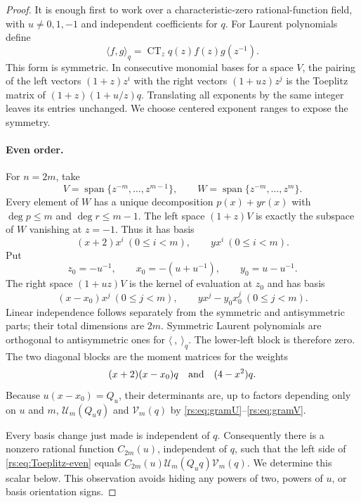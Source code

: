 \documentclass[11pt]{article}
\theoremstyle{definition}
\theoremstyle{remark}
\newcommand{\CT}{\operatorname{CT}}
\newcommand{\UU}{\mathcal U}
\newcommand{\VV}{\mathcal V}
\theoremstyle{definition}
\theoremstyle{plain}
\numberwithin{equation}{section}
\begin{document}
\begin{proof}
It is enough first to work over a characteristic-zero rational-function
field, with $u\ne0,1,-1$ and independent coefficients for $q$.
For Laurent polynomials define
\[
 \langle f,g\rangle_q=\CT_z q(z)f(z)g(z^{-1}).
\]
This form is symmetric. In consecutive monomial bases for a space $V$, the
pairing of the left vectors $(1+z)z^i$ with the right vectors
$(1+uz)z^j$ is the Toeplitz matrix of $(1+z)(1+u/z)q$.
Translating all exponents by the same integer leaves its entries unchanged.
We choose centered exponent ranges to expose the symmetry.

\paragraph{Even order.}
For $n=2m$, take
\[
 V=\operatorname{span}\{z^{-m},\ldots,z^{m-1}\},\qquad
 W=\operatorname{span}\{z^{-m},\ldots,z^m\}.
\]
Every element of $W$ has a unique decomposition
$p(x)+y r(x)$ with $\deg p\le m$ and $\deg r\le m-1$.
The left space $(1+z)V$ is exactly the subspace of $W$ vanishing at $z=-1$.
Thus it has basis
\[
 (x+2)x^i\ (0\le i<m),\qquad yx^i\ (0\le i<m).
\]
Put
\[
 z_0=-u^{-1},\qquad x_0=-(u+u^{-1}),\qquad y_0=u-u^{-1}.
\]
The right space $(1+uz)V$ is the kernel of evaluation at $z_0$ and has basis
\[
 (x-x_0)x^j\ (0\le j<m),\qquad
 yx^j-y_0x_0^j\ (0\le j<m).
\]
Linear independence follows separately from the symmetric and antisymmetric
parts; their total dimensions are $2m$. Symmetric Laurent polynomials are
orthogonal to antisymmetric ones for $\langle\ ,\ \rangle_q$.
The lower-left block is therefore zero. The two diagonal blocks are the
moment matrices for the weights
\[
 (x+2)(x-x_0)q\quad\hbox{and}\quad(4-x^2)q.
\]
Because $u(x-x_0)=Q_u$, their determinants are, up to factors depending
only on $u$ and $m$, $\UU_m(Q_uq)$ and $\VV_m(q)$ by
\eqref{rs:eq:gramU}--\eqref{rs:eq:gramV}.

Every basis change just made is independent of $q$. Consequently there is
a nonzero rational function $C_{2m}(u)$, independent of $q$, such that the
left side of \eqref{rs:eq:Toeplitz-even} equals
$C_{2m}(u)\UU_m(Q_uq)\VV_m(q)$. We determine this scalar below.
This observation avoids hiding any powers of two, powers of $u$, or basis
orientation signs.


\end{proof}
\end{document}
